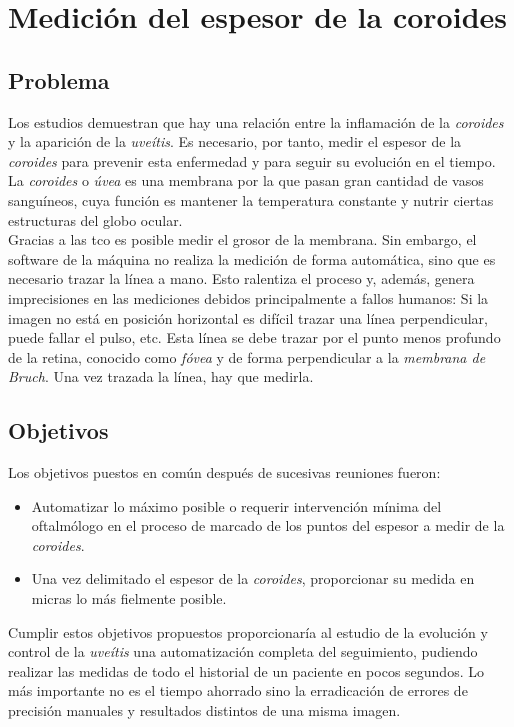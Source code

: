 \chapter{Medición del espesor de la coroides}
\section{Problema}
Los estudios demuestran que hay una relación entre la inflamación de
la \emph{coroides} y la aparición de la \emph{uveítis}. Es necesario,
por tanto, medir el espesor de la \emph{coroides} para prevenir esta
enfermedad y para seguir su evolución en el tiempo.\\
La \emph{coroides} o \emph{úvea} es una membrana por la que pasan gran
cantidad de vasos sanguíneos, cuya función es mantener la temperatura
constante y nutrir ciertas estructuras del globo ocular. \\
Gracias a las \gls{tco} es posible medir el grosor de la membrana. Sin
embargo, el software de la máquina no realiza la medición de forma
automática, sino que es necesario trazar la línea a mano. Esto
ralentiza el proceso y, además, genera imprecisiones en las mediciones
debidos principalmente a fallos humanos: Si la imagen no está en
posición horizontal es difícil trazar una línea perpendicular, puede
fallar el pulso, etc. Esta línea se debe trazar por el punto menos
profundo de la retina, conocido como \emph{fóvea} y de forma
perpendicular a la \emph{membrana de Bruch}. Una vez trazada
 la línea,
hay que medirla.


\section{Objetivos}
Los objetivos puestos en común después de sucesivas reuniones fueron:
\begin{itemize}
\item Automatizar lo máximo posible o requerir intervención mínima del
  oftalmólogo en el proceso de marcado de los puntos del espesor a
  medir de la \emph{coroides}.
\item Una vez delimitado el espesor de la \emph{coroides},
  proporcionar su medida en micras lo más fielmente posible.
\end{itemize}
Cumplir estos objetivos propuestos proporcionaría al estudio de la
evolución y control de la \emph{uveítis} una automatización completa
del seguimiento, pudiendo realizar las medidas de todo el historial de
un paciente en pocos segundos. Lo más importante no es el tiempo
ahorrado sino la erradicación de errores de precisión manuales y
resultados distintos de una misma imagen.

